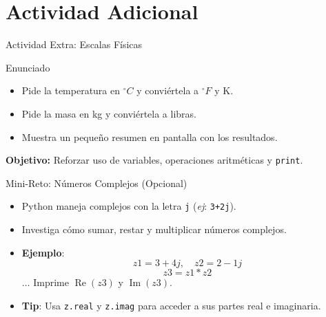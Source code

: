 \documentclass[10pt]{beamer}
\begin{document}
\section{Actividad Adicional}

\begin{frame}{Actividad Extra: Escalas Físicas}
  \begin{block}{Enunciado}
    \begin{itemize}
      \item Pide la temperatura en \(^\circ C\) y conviértela a \(^\circ F\) y K.
      \item Pide la masa en kg y conviértela a libras.
      \item Muestra un pequeño resumen en pantalla con los resultados.
    \end{itemize}
  \end{block}
  \textbf{Objetivo:} Reforzar uso de variables, operaciones aritméticas y \texttt{print}.
\end{frame}

\begin{frame}{Mini-Reto: Números Complejos (Opcional)}
  \begin{itemize}
    \item Python maneja complejos con la letra \texttt{j} (\emph{ej}: \texttt{3+2j}).
    \item Investiga cómo sumar, restar y multiplicar números complejos.
    \item \textbf{Ejemplo}:
      \[
        z1 = 3 + 4j, \quad z2 = 2 - 1j
      \]
      \[
        z3 = z1 * z2
      \]
      \(\dots\) Imprime \(\operatorname{Re}(z3)\) y \(\operatorname{Im}(z3)\).
    \item \textbf{Tip}: Usa \texttt{z.real} y \texttt{z.imag} para acceder a sus partes real e imaginaria.
  \end{itemize}
\end{frame}
\end{document}
